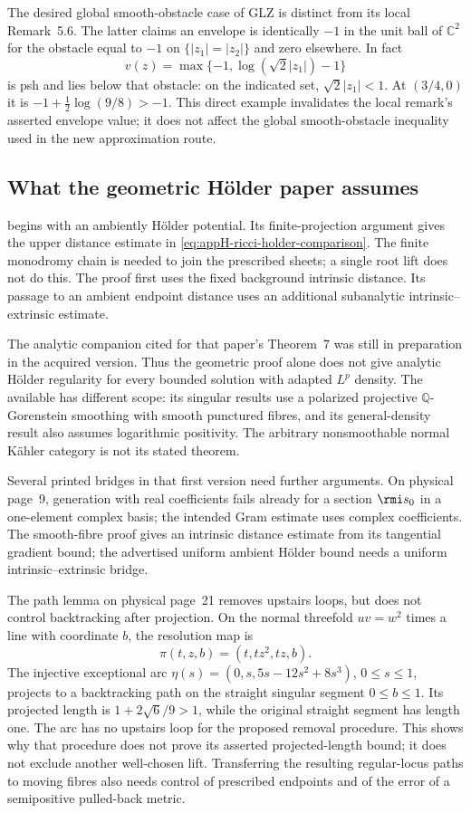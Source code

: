 The desired global smooth-obstacle case of GLZ is distinct
from its local Remark~5.6. The latter claims an envelope
is identically \(-1\) in the unit ball of \(\mathbb C^2\)
for the obstacle equal to \(-1\) on
\(\{|z_1|=|z_2|\}\) and zero elsewhere. In fact
\[
 v(z)=\max\{-1,\log(\sqrt2|z_1|)-1\}
\]
is psh and lies below that obstacle: on the indicated
set, \(\sqrt2|z_1|<1\). At \((3/4,0)\) it is
\(-1+\tfrac12\log(9/8)>-1\). This direct example
invalidates the local remark's asserted envelope value;
it does not affect the global smooth-obstacle inequality
used in the new approximation route.

\subsection{What the geometric H\"older paper assumes}

\cite[Proposition~1]{GSS26GeometricHolderV1} begins with
an ambiently H\"older potential. Its finite-projection
argument gives the upper distance estimate in
\eqref{eq:appH-ricci-holder-comparison}. The finite
monodromy chain is needed to join the prescribed sheets;
a single root lift does not do this. The proof first
uses the fixed background intrinsic distance. Its passage
to an ambient endpoint distance uses an additional
subanalytic intrinsic--extrinsic estimate.

The analytic companion cited for that paper's Theorem~7
was still in preparation in the acquired version. Thus
the geometric proof alone does not give analytic H\"older
regularity for every bounded solution with adapted
\(L^p\) density. The available \cite{GKSS25HolderV1}
has different scope: its singular results use a polarized
projective \(\mathbb Q\)-Gorenstein smoothing with smooth
punctured fibres, and its general-density result also
assumes logarithmic positivity. The arbitrary nonsmoothable
normal K\"ahler category is not its stated theorem.

Several printed bridges in that first version need further
arguments. On physical page~9, generation with real
coefficients fails already for a section \(\rmi s_0\)
in a one-element complex basis; the intended Gram estimate
uses complex coefficients. The smooth-fibre proof gives
an intrinsic distance estimate from its tangential gradient
bound; the advertised uniform ambient H\"older bound
needs a uniform intrinsic--extrinsic bridge.

The path lemma on physical page~21 removes upstairs
loops, but does not control backtracking after projection.
On the normal threefold
\(uv=w^2\) times a line with coordinate \(b\), the
resolution map is
\[
 \pi(t,z,b)=(t,tz^2,tz,b).
\]
The injective exceptional arc
\(\eta(s)=(0,s,5s-12s^2+8s^3)\), \(0\leq s\leq1\),
projects to a backtracking path on the straight singular
segment \(0\leq b\leq1\). Its projected length is
\(1+2\sqrt6/9>1\), while the original straight segment
has length one. The arc has no upstairs loop for the
proposed removal procedure. This shows why that procedure
does not prove its asserted projected-length bound;
it does not exclude another well-chosen lift.
Transferring the resulting regular-locus paths to moving
fibres also needs control of prescribed endpoints and
of the error of a semipositive pulled-back metric.

